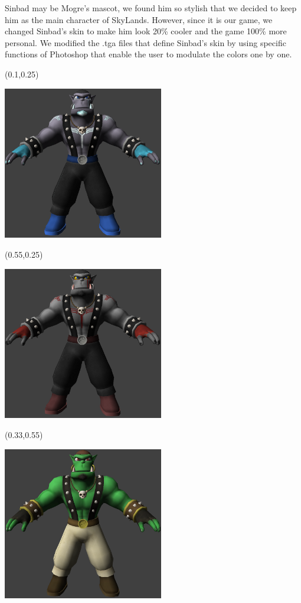 \documentclass[article]{report}         %
\begin{document}
Sinbad may be Mogre's mascot, we found him so stylish that we decided to keep him as the main character of SkyLands. However, since it is our game, we changed Sinbad's skin to make him look 20\% cooler and the game 100\% more personal. We modified the .tga files that define Sinbad's skin by using specific functions of Photoshop that enable the user to modulate the colors one by one.\\

\begin{textblock}{0.4}(0.1,0.25)

\includegraphics[width=7cm]{images/Skins/Neo_sinbad.png}

\end{textblock}
\begin{textblock}{0.4}(0.55,0.25)

\includegraphics[width=7cm]{images/Skins/Vamp_sinbad.png}

\end{textblock}


\begin{textblock}{0.4}(0.33,0.55)

\includegraphics[width=7cm]{images/Skins/normal_sinbad.png}

\end{textblock}
\end{document}

